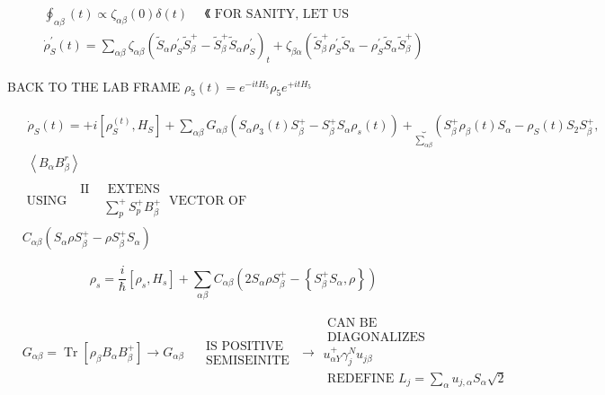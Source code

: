 \documentclass[10pt]{article}
\begin{document}
$$
\begin{array}{r}
\oint_{\alpha \beta}(t) \propto \zeta_{\alpha \beta}(0) \delta(t) \quad \text { 《 FOR SANITY, LET US } \\
\dot{\rho}_{S}^{\prime}(t)=\sum_{\alpha \beta} \zeta_{\alpha \beta}\left(\tilde{S}_{\alpha} \rho_{S}^{\prime} \tilde{S}_{\beta}^{+}-\tilde{S}_{\beta}^{+} \tilde{S}_{\alpha} \rho_{S}^{\prime}\right)_{t}+\zeta_{\beta \alpha}\left(\tilde{S}_{\beta}^{+} \rho_{S}^{\prime} \tilde{S}_{\alpha}-\rho_{S}^{\prime} \tilde{S}_{\alpha} \tilde{S}_{\beta}^{+}\right)
\end{array}
$$

BACK TO THE LAB FRAME $\rho_{5}(t)=e^{-i t H_{5}} \rho_{5} e^{+i t H_{5}}$

$$
\begin{aligned}
& \begin{array}{c}
\dot{\rho}_{S}(t)=+i\left[\rho_{S}^{(t)}, H_{S}\right]+\sum_{\alpha \beta} G_{\alpha \beta}\left(S_{\alpha} \rho_{3}(t) S_{\beta}^{+}-S_{\beta}^{+} S_{\alpha} \rho_{s}(t)\right)+\underbrace{}_{\sum_{\alpha \beta}}\left(S_{\beta}^{+} \rho_{\beta}(t) S_{\alpha}-\rho_{S}(t) S_{2} S_{\beta}^{+},\right. \\
\left\langle B_{\alpha} B_{\beta}^{r}\right\rangle
\end{array} \\
& \text { USING } \begin{array}{ll}
\text { II } & \text { EXTENS } \\
& \sum_{p}^{+} S_{p}^{+} B_{\beta}^{+}
\end{array} \text {VECTOR OF } \\
& C_{\alpha \beta}\left(S_{\alpha} \rho S_{\beta}^{+}-\rho S_{\beta}^{+} S_{\alpha}\right)
\end{aligned}
$$

$$
\rho_{s}=\frac{i}{\hbar}\left[\rho_{s}, H_{s}\right]+\sum_{\alpha \beta} C_{\alpha \beta}\left(2 S_{\alpha} \rho S_{\beta}^{+}-\left\{S_{\beta}^{+} S_{\alpha}, \rho\right\}\right)
$$

$$
\begin{aligned}
& G_{\alpha \beta}=\operatorname{Tr}\left[\rho_{\beta} B_{\alpha} B_{\beta}^{+}\right] \rightarrow G_{\alpha \beta} \quad \begin{array}{c}
\text { IS POSITIVE } \\
\text { SEMISEINITE }
\end{array} \rightarrow \begin{array}{c}
\text { CAN BE } \\
\text { DIAGONALIZES } \\
u_{\alpha Y}^{+} \gamma_{j}^{N} u_{j \beta} \\
\text { REDEFINE } L_{j}=\sum_{\alpha} u_{j, \alpha} S_{\alpha} \sqrt{2}
\end{array}
\end{aligned}
$$
\end{document}
